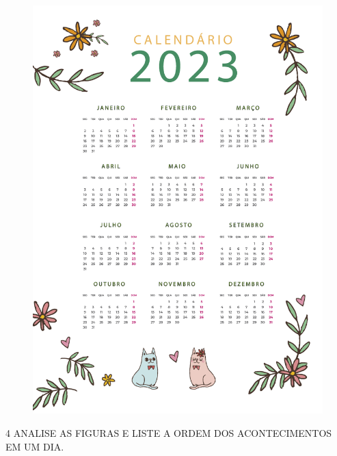 \begin{figure}[htpb!]
\centering
\includegraphics[width=.9\textwidth]{../ilustracoes/MAT1/SAEB_1ANO_MAT_FIGURA51.png}
\end{figure}


\pagebreak
\num{4} ANALISE AS FIGURAS E LISTE A ORDEM DOS ACONTECIMENTOS EM UM DIA.


